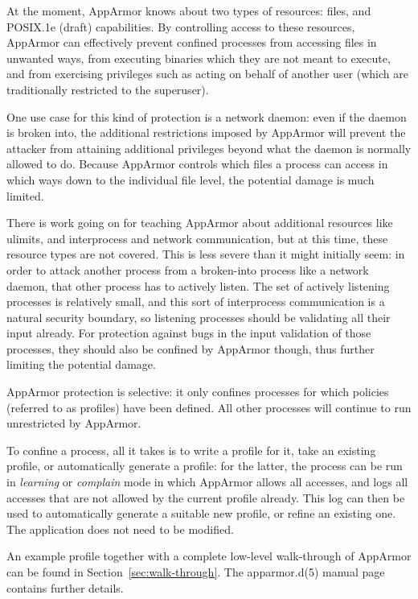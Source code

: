 \documentclass[a4paper]{article}
\begin{document}
At the moment, AppArmor knows about two types of resources: files, and
POSIX.1e (draft) capabilities.  By controlling access to these
resources, AppArmor can effectively prevent confined processes from
accessing files in unwanted ways, from executing binaries which they are
not meant to execute, and from exercising privileges such as acting on
behalf of another user (which are traditionally restricted to the
superuser).

One use case for this kind of protection is a network daemon: even if
the daemon is broken into, the additional restrictions imposed by
AppArmor will prevent the attacker from attaining additional privileges
beyond what the daemon is normally allowed to do.  Because AppArmor
controls which files a process can access in which ways down to the
individual file level, the potential damage is much limited.

There is work going on for teaching AppArmor about additional resources
like ulimits, and interprocess and network communication, but at this
time, these resource types are not covered.  This is less severe than it
might initially seem: in order to attack another process from a
broken-into process like a network daemon, that other process has to
actively listen.  The set of actively listening processes is relatively
small, and this sort of interprocess communication is a natural security
boundary, so listening processes should be validating all their input
already.  For protection against bugs in the input validation of those
processes, they should also be confined by AppArmor though, thus further
limiting the potential damage.

AppArmor protection is selective: it only confines processes for which
policies (referred to as profiles) have been defined.  All other
processes will continue to run unrestricted by AppArmor.

To confine a process, all it takes is to write a profile for it, take an
existing profile, or automatically generate a profile: for the latter,
the process can be run in \textit{learning} or \textit{complain} mode in
which AppArmor allows all accesses, and logs all accesses that are not
allowed by the current profile already. This log can then be used to
automatically generate a suitable new profile, or refine an existing
one.  The application does not need to be modified.

An example profile together with a complete low-level walk-through of
AppArmor can be found in Section~\ref{sec:walk-through}.  The
apparmor.d(5) manual page contains further details.
\end{document}
